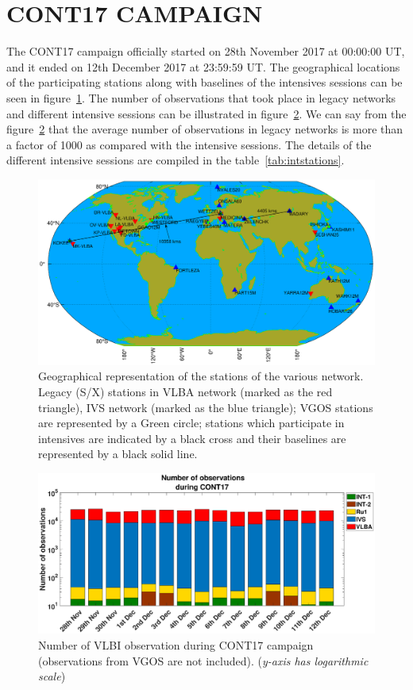 \documentclass[smallextended]{svjour3}       %
\begin{document}
\section{CONT17 CAMPAIGN}
The CONT17 campaign officially started on 28th November 2017 at 00:00:00 UT, and it ended on 12th December 2017 at 23:59:59 UT. The geographical locations of the participating stations along with baselines of the intensives sessions can be seen in figure~\ref{fig:cont17stations}. The number of observations that took place in legacy networks and different intensive sessions can be illustrated in figure~\ref{fig:noofobs}. We can say from the figure~\ref{fig:noofobs}  that the average number of observations in legacy networks is more than a factor of 1000 as compared with the intensive sessions. The details of the different intensive sessions are compiled in the table~\ref{tab:intstations}.

\begin{figure}[h]
    \centering
    \includegraphics[scale=0.31]{VLBI_station_c.eps}
    \caption{Geographical representation of the stations of the various network. Legacy (S/X) stations in VLBA network (marked as the red triangle), IVS network (marked as the blue triangle); VGOS stations are represented by a Green circle; stations which participate in intensives are indicated by a black cross and their baselines are represented by a black solid line. \citep{rauteffect}}
    \label{fig:cont17stations}
\end{figure}

\begin{figure}[h]
    \centering
    \includegraphics[scale=0.3]{noofobslog.eps}
    \caption{Number of VLBI observation during CONT17 campaign (observations from VGOS are not included). (\textit{y-axis has logarithmic scale})}
    \label{fig:noofobs}
\end{figure}
\end{document}
